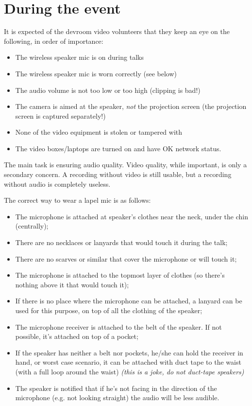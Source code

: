 \documentclass{article}
\begin{document}
\section{During the event}
It is expected of the devroom video volunteers that they keep an eye on the following, in order of importance:
\begin{itemize}
  \item The wireless speaker mic is on during talks
  \item The wireless speaker mic is worn correctly (see below)
  \item The audio volume is not too low or too high (clipping is bad!)
  \item The camera is aimed at the speaker, \emph{not} the projection screen (the projection screen is captured separately!)
  \item None of the video equipment is stolen or tampered with
  \item The video boxes/laptops are turned on and have OK network status.
\end{itemize}
The main task is ensuring audio quality. Video quality, while important, is only a secondary concern. A recording without video is still usable, but a recording without audio is completely useless.

The correct way to wear a lapel mic is as follows:
\begin{itemize}
  \item The microphone is attached at speaker's clothes near the neck, under the chin (centrally);
  \item There are no necklaces or lanyards that would touch it during the talk;
  \item There are no scarves or similar that cover the microphone or will touch it;
  \item The microphone is attached to the topmost layer of clothes (so there's nothing above it that would touch it);
  \item If there is no place where the microphone can be attached, a lanyard can be used for this purpose, on top of all the clothing of the speaker;
  \item The microphone receiver is attached to the belt of the speaker. If not possible, it's attached on top of a pocket;
  \item If the speaker has neither a belt nor pockets, he/she can hold the receiver in hand, or worst case scenario, it can be attached with duct tape to the waist (with a full loop around the waist) \emph{(this is a joke, do not duct-tape speakers)}
  \item The speaker is notified that if he's not facing in the direction of the microphone (e.g. not looking straight) the audio will be less audible.
\end{itemize}
\end{document}
